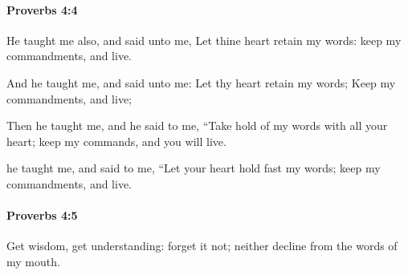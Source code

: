 		\paragraph{Proverbs 4:4} %
			\label{PROVERBS-4-4}

			He taught me also, and said unto me, Let thine heart retain my words: keep my commandments, and live.

			\begin{versebox}
					\item[BHS] 
					\item[ASV] And he taught me, and said unto me: Let thy heart retain my words; Keep my commandments, and live;
					\item[NIV] Then he taught me, and he said to me, “Take hold of my words with all your heart; keep my commands, and you will live.
					\item[NRSV] he taught me, and said to me, “Let your heart hold fast my words; keep my commandments, and live.
			\end{versebox}

		\paragraph{Proverbs 4:5} %
			\label{PROVERBS-4-5}

			Get wisdom, get understanding: forget it not; neither decline from the words of my mouth.

